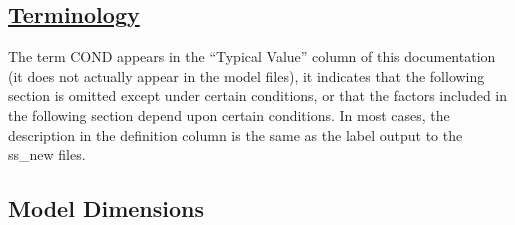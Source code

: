 \hypertarget{DataTerminology}{}
\subsection[Terminology]{\protect\hyperlink{DataTerminology}{Terminology}}
The term COND appears in the ``Typical Value'' column of this documentation (it does not actually appear in the model files), it indicates that the following section is omitted except under certain conditions, or that the factors included in the following section depend upon certain conditions. In most cases, the description in the definition column is the same as the label output to the ss\_new files.

\hypertarget{ModelDimensions}{}
\subsection[Model Dimensions]{\protect\hypertarget{ModelDimensions}{Model Dimensions}}
